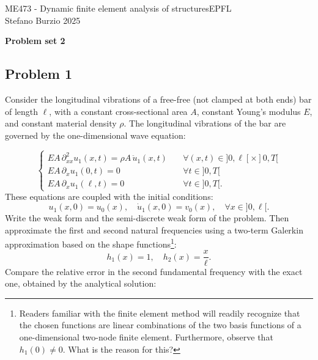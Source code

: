 \documentclass[12pt]{article}
\begin{document}
\noindent ME473 - Dynamic finite element analysis of structures\hfill EPFL\\
Stefano Burzio \hfill 2025\\
\vspace{0.3cm}

\hspace*{\fill}\textbf{\Large Problem set 2}\hspace*{\fill}

\hrulefill

\subsection*{Problem 1}
Consider the longitudinal vibrations of a free-free (not clamped at both ends) bar of length \( \ell \), with a constant cross-sectional area \( A \), constant Young's modulus \( E \), and constant material density \( \rho \). The longitudinal vibrations of the bar are governed by the one-dimensional wave equation:

\begin{equation*}
    \begin{cases}
        EA \, \partial^{2}_{xx} u_{1}(x, t) = \rho A \, \ddot{u}_1(x, t) \quad & \forall (x, t) \in ]0, \ell[ \times ]0, T[ \\
        EA \, \partial_{x} u_1(0, t) = 0 \quad                                 & \forall t \in ]0, T[                       \\
        EA \, \partial_{x} u_1(\ell, t) = 0 \quad                              & \forall t \in ]0, T[.
    \end{cases}
\end{equation*}
These equations are coupled with the initial conditions:
\begin{equation*}
    u_1(x, 0) = u_0(x), \quad \dot{u}_1(x, 0) = v_0(x), \quad \forall x \in ]0, \ell[.
\end{equation*}
Write the weak form and the semi-discrete weak form of the problem. Then approximate the first and second natural frequencies using a two-term Galerkin approximation based on the shape functions\footnote{Readers familiar with the finite element method will readily recognize that the chosen functions are linear combinations of the two basis functions of a one-dimensional two-node finite element. Furthermore, observe that \( h_1(0) \neq 0 \). What is the reason for this?}:
\begin{equation*}
    h_1(x) = 1, \quad h_2(x) = \frac{x}{\ell}.
\end{equation*}
Compare the relative error in the second fundamental frequency with the exact one, obtained by the analytical solution:
\end{document}
